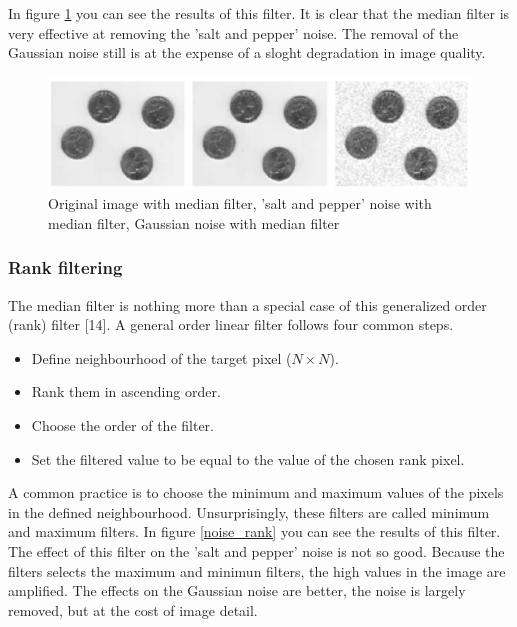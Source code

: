 \documentclass[12pt]{article}
\begin{document}
In figure \ref{noise_median} you can see the results of this filter. It is clear that the median filter is very effective at removing the 'salt and pepper' noise. The removal of the Gaussian noise still is at the expense of a sloght degradation in image quality. 

\begin{figure}[h]
\hspace*{-1.7cm}
\centering
\includegraphics[scale = 0.9]{img/noise_median}
\caption{Original image with median filter, 'salt and pepper' noise with median filter, Gaussian noise with median filter}
\label{noise_median}
\end{figure}

\subsubsection{Rank filtering}

The median filter is nothing more than a special case of this generalized order (rank) filter [14]. A general order linear filter follows four common steps.

\begin{itemize}
\item Define neighbourhood of the target pixel ($N\times N$).
\item Rank them in ascending order.
\item Choose the order of the filter.
\item Set the filtered value to be equal to the value of the chosen rank pixel.
\end{itemize}

A common practice is to choose the minimum and maximum values of the pixels in the defined neighbourhood. Unsurprisingly, these filters are called minimum and maximum filters. In figure \ref{noise_rank} you can see the results of this filter. The effect of this filter on the 'salt and pepper' noise is not so good. Because the filters selects the maximum and minimun filters, the high values in the image are amplified. The effects on the Gaussian noise are better, the noise is largely removed, but at the cost of image detail.
\end{document}
